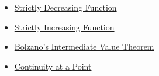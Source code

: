 \begin{dependencies}
\begin{itemize}
  \item \hyperref[def:function-strictly-decreasing]{Strictly Decreasing Function}
  \item \hyperref[def:function-strictly-increasing]{Strictly Increasing Function}
  \item \hyperref[thm:bolzano-intermediate-value]{Bolzano's Intermediate Value Theorem}
  \item \hyperref[def:continuous-at-point]{Continuity at a Point}
\end{itemize}
\end{dependencies}
